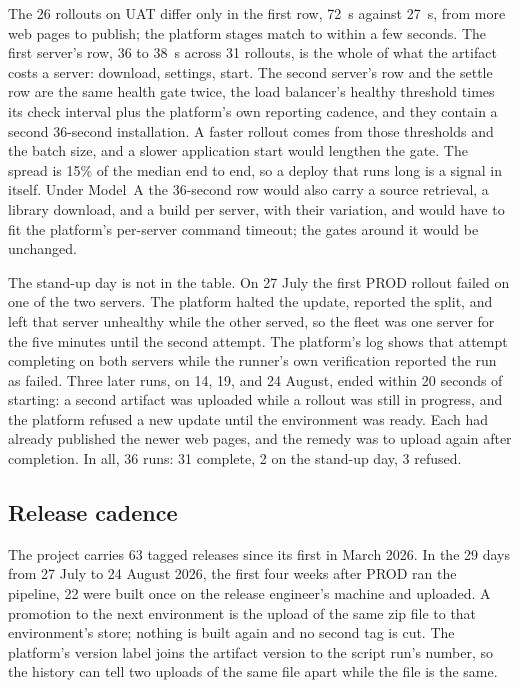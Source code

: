 \documentclass[11pt]{article}
\begin{document}
The 26 rollouts on UAT differ only in the first row, 72~s against 27~s, from more web pages to publish; the platform stages match to within a few seconds. The first server's row, 36 to 38~s across 31 rollouts, is the whole of what the artifact costs a server: download, settings, start. The second server's row and the settle row are the same health gate twice, the load balancer's healthy threshold times its check interval plus the platform's own reporting cadence, and they contain a second 36-second installation. A faster rollout comes from those thresholds and the batch size, and a slower application start would lengthen the gate. The spread is 15\% of the median end to end, so a deploy that runs long is a signal in itself. Under Model~A the 36-second row would also carry a source retrieval, a library download, and a build per server, with their variation, and would have to fit the platform's per-server command timeout; the gates around it would be unchanged.

The stand-up day is not in the table. On 27 July the first PROD rollout failed on one of the two servers. The platform halted the update, reported the split, and left that server unhealthy while the other served, so the fleet was one server for the five minutes until the second attempt. The platform's log shows that attempt completing on both servers while the runner's own verification reported the run as failed. Three later runs, on 14, 19, and 24 August, ended within 20 seconds of starting: a second artifact was uploaded while a rollout was still in progress, and the platform refused a new update until the environment was ready. Each had already published the newer web pages, and the remedy was to upload again after completion. In all, 36 runs: 31 complete, 2 on the stand-up day, 3 refused.

\subsection{Release cadence}

The project carries 63 tagged releases since its first in March 2026. In the 29 days from 27 July to 24 August 2026, the first four weeks after PROD ran the pipeline, 22 were built once on the release engineer's machine and uploaded. A promotion to the next environment is the upload of the same zip file to that environment's store; nothing is built again and no second tag is cut. The platform's version label joins the artifact version to the script run's number, so the history can tell two uploads of the same file apart while the file is the same.
\end{document}
